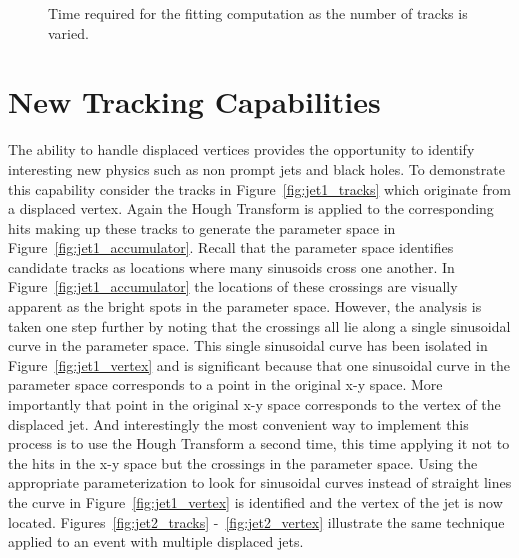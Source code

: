 \documentclass{JINST}
\begin{document}
\begin{figure}[!Hhtb]
\begin{minipage}[t]{8.0cm}
\begin{center}
	\caption{Time required for the fitting computation as the number of tracks is varied.  \label{fig:TimeVsTracks}}
	\end{center}
\end{minipage}
\end{figure}

\section{New Tracking Capabilities}

The ability to handle displaced vertices provides the opportunity to identify interesting new physics such as non prompt jets and black holes.  
To demonstrate this capability consider the tracks in Figure~\ref{fig:jet1_tracks} which originate from a displaced vertex.  
Again the Hough Transform is applied to the corresponding hits making up these tracks to generate the parameter space in 
Figure~\ref{fig:jet1_accumulator}.  Recall that the parameter space identifies candidate tracks as locations where many 
sinusoids cross one another.  In Figure~\ref{fig:jet1_accumulator} the locations of these crossings are visually apparent 
as the bright spots in the parameter space.  However, the analysis is taken one step further by noting that the crossings
 all lie along a single sinusoidal curve in the parameter space.  This single sinusoidal curve has been isolated in 
Figure~\ref{fig:jet1_vertex} and is significant because that one sinusoidal curve in the parameter space corresponds to 
a point in the original x-y space.  More importantly that point in the original x-y space corresponds to the vertex of the displaced jet. 
 And interestingly the most convenient way to implement this process is to use the Hough Transform a second time, this time applying 
it not to the hits in the x-y space but the crossings in the parameter space.  Using the appropriate parameterization to look for sinusoidal curves
 instead of straight lines the curve in Figure~\ref{fig:jet1_vertex} is identified and the vertex of the jet is now located.  
Figures~\ref{fig:jet2_tracks} -~\ref{fig:jet2_vertex} illustrate the same technique applied to an event with multiple displaced jets.
\end{document}
